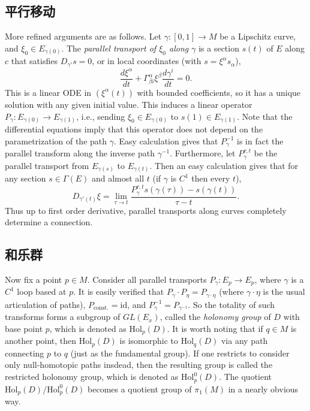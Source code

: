 \subsection{平行移动}
More refined arguments are as follows. Let $\gamma:[0,1]\to M$ be a Lipschitz curve, and $\xi_0\in E_{\gamma(0)}$. The \emph{parallel transport of $\xi_0$ along $\gamma$} is a section $s(t)$ of $E$ along $c$ that satisfies $D_{\gamma'}s=0$, or in local coordinates (with $s=\xi^\alpha s_\alpha$),
$$\frac{d\xi^\alpha}{dt}+\Gamma_{\beta i}^\alpha\xi^\beta\frac{d\gamma^i}{dt}=0.$$
This is a linear ODE in $(\xi^\alpha(t))$ with bounded coefficients, so it has a unique solution with any given initial value. This induces a linear operator $P_{\gamma}:E_{\gamma(0)}\to E_{\gamma(1)}$, i.e., sending $\xi_0\in E_{\gamma(0)}$ to $s(1)\in E_{\gamma(1)}$. Note that the differential equations imply that this operator does not depend on the parametrization of the path $\gamma$. Easy calculation gives that $P_\gamma^{-1}$ is in fact the parallel transform along the inverse path $\gamma^{-1}$. Furthermore, let $P_\gamma^{\tau,t}$ be the parallel transport from $E_{\gamma(s)}$ to $E_{\gamma(t)}$. Then an easy calculation gives that for any section $s\in\Gamma(E)$ and almost all $t$ (if $\gamma$ is $C^1$ then every $t$),
$$D_{\gamma'(t)}\xi=\lim_{\tau\to t}\frac{P_\gamma^{\tau,t}s(\gamma(\tau))-s(\gamma(t))}{\tau-t}.$$
Thus up to first order derivative, parallel transports along curves completely determine a connection.

\subsection{和乐群}
Now fix a point $p\in M$. Consider all parallel transports $P_\gamma:E_p\to E_p$, where $\gamma$ is a $C^1$ loop based at $p$. It is easily verified that $P_\gamma\cdot P_\eta=P_{\gamma\cdot\eta}$ (where $\gamma\cdot\eta$ is the usual articulation of paths), $P_{\text{const.}}=\text{id}$, and $P_\gamma^{-1}=P_{\gamma^{-1}}$. So the totality of such transforms forms a subgroup of $GL(E_x)$, called the \emph{holonomy group} of $D$ with base point $p$, which is denoted as $\text{Hol}_p(D)$. It is worth noting that if $q\in M$ is another point, then $\text{Hol}_p(D)$ is isomorphic to $\text{Hol}_q(D)$ via any path connecting $p$ to $q$ (just as the fundamental group). If one restricts to consider only null-homotopic paths insdead, then the resulting group is called the restricted holonomy group, which is denoted as $\text{Hol}^0_p(D)$. The quotient $\text{Hol}_p(D)/\text{Hol}_p^0(D)$ becomes a quotient group of $\pi_1(M)$ in a nearly obvious way.

